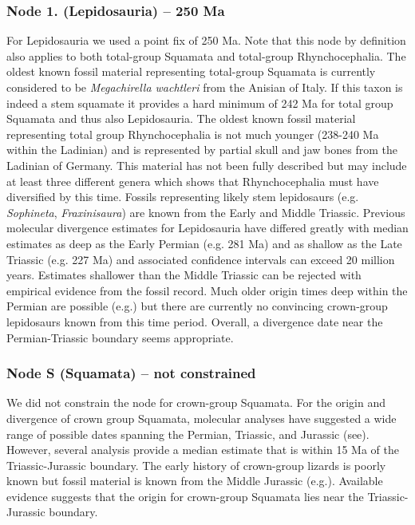 \documentclass[a4paper, 12pt]{article}
\begin{document}
\subsubsection*{Node 1. (Lepidosauria) – 250 Ma}
For Lepidosauria we used a point fix of 250 Ma. Note that this node by definition also applies to both total-group Squamata and total-group Rhynchocephalia\cite{evans2003feet}. The oldest known fossil material representing total-group Squamata is currently considered to be \textit{Megachirella wachtleri} from the Anisian of Italy\cite{renesto2003new,simoes2018origin}. If this taxon is indeed a stem squamate it provides a hard minimum of 242 Ma for total group Squamata and thus also Lepidosauria. The oldest known fossil material representing total group Rhynchocephalia is not much younger (238-240 Ma within the Ladinian) and is represented by partial skull and jaw bones from the Ladinian of Germany\cite{jones2013integration,schoch2018tetrapod}. This material has not been fully described but may include at least three different genera which shows that Rhynchocephalia must have diversified by this time. Fossils representing likely stem lepidosaurs (e.g. \textit{Sophineta}, \textit{Fraxinisaura}) are known from the Early and Middle Triassic\cite{evans2009small,schoch2018tetrapod}. Previous molecular divergence estimates for Lepidosauria have differed greatly\cite{jones2013integration} with median estimates as deep as the Early Permian (e.g. 281 Ma) and as shallow as the Late Triassic (e.g. 227 Ma) and associated confidence intervals can exceed 20 million years. Estimates shallower than the Middle Triassic can be rejected with empirical evidence from the fossil record\cite{jones2013integration,simoes2018origin}. Much older origin times deep within the Permian are possible (e.g.\cite{simoes2018origin}) but there are currently no convincing crown-group lepidosaurs known from this time period. Overall, a divergence date near the Permian-Triassic boundary seems appropriate.  

\subsubsection*{Node S (Squamata) – not constrained}
We did not constrain the node for crown-group Squamata. For the origin and divergence of crown group Squamata, molecular analyses have suggested a wide range of possible dates spanning the Permian, Triassic, and Jurassic (see\cite{jones2013integration}). However, several analysis provide a median estimate that is within 15 Ma of the Triassic-Jurassic boundary\cite{jones2013integration,simoes2018origin,burbrink2020interrogating}. The early history of crown-group lizards is poorly known but fossil material is known from the Middle Jurassic (e.g.\cite{evans1998crown,evans2003feet,evans2008skull}). Available evidence suggests that the origin for crown-group Squamata lies near the Triassic-Jurassic boundary. 
\end{document}

